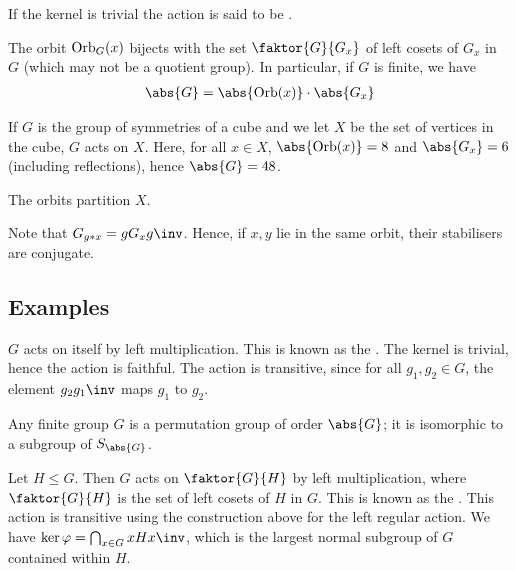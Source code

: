 \begin{definition}
	If the kernel is trivial the action is said to be .
\end{definition} 

\begin{theorem}
	The orbit $\operatorname{Orb}_G(x)$ bijects with the set $\faktor{G}{G_x}$ of left cosets of $G_x$ in $G$ (which may not be a quotient group).
	In particular, if $G$ is finite, we have
	\begin{align*}
		\abs{G} = \abs{\Orb(x)} \cdot \abs{G_x}
	\end{align*}
\end{theorem}

\begin{example}
	If $G$ is the group of symmetries of a cube and we let $X$ be the set of vertices in the cube, $G$ acts on $X$.
	Here, for all $x \in X$, $\abs{\Orb(x)} = 8$ and $\abs{G_x} = 6$ (including reflections), hence $\abs{G} = 48$.
\end{example}

\begin{remark}
	The orbits partition $X$.

	Note that $G_{g \ast x} = g G_x g\inv$.
	Hence, if $x, y$ lie in the same orbit, their stabilisers are conjugate.
\end{remark}

\subsection{Examples}
\begin{example}
	$G$ acts on itself by left multiplication.
	This is known as the .
	The kernel is trivial, hence the action is faithful.
	The action is transitive, since for all $g_1, g_2 \in G$, the element $g_2 g_1\inv$ maps $g_1$ to $g_2$.
\end{example}

\begin{theorem}
	Any finite group $G$ is a permutation group of order $\abs{G}$; it is isomorphic to a subgroup of $S_\abs{G}$.
\end{theorem}

\begin{example}
	Let $H \leq G$.
	Then $G$ acts on $\faktor{G}{H}$ by left multiplication, where $\faktor{G}{H}$ is the set of left cosets of $H$ in $G$.
	This is known as the .
	This action is transitive using the construction above for the left regular action.
	We have $\ker\varphi = \bigcap_{x \in G} xHx\inv$, which is the largest normal subgroup of $G$ contained within $H$.
\end{example}

